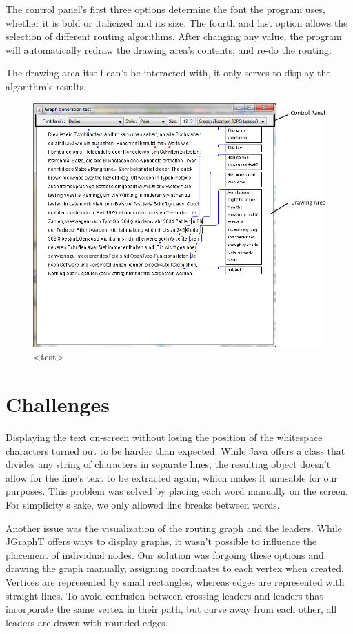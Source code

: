 \documentclass[11pt,a4paper]{vutinfth}
\begin{document}
The control panel's first three options determine the font the program uses, whether it is bold or italicized and its size. The fourth and last option allows the selection of different routing algorithms. After changing any value, the program will automatically redraw the drawing area's contents, and re-do the routing.

The drawing area itself can't be interacted with, it only serves to display the algorithm's results.
\begin{figure}
	\captionsetup{justification=centering, margin=0.75cm}
	\centering
	\includegraphics[scale=0.75]{ProgramWindowAnnotated.png}
	\caption{<test>}
	\label{fig:ProgWindow}
\end{figure}

\section{Challenges}

Displaying the text on-screen without losing the position of the whitespace characters turned out to be harder than expected. While Java offers a class that divides any string of characters in separate lines, the resulting object doesn't allow for the line's text to be extracted again, which makes it unusable for our purposes. This problem was solved by placing each word manually on the screen. For simplicity's sake, we only allowed line breaks between words.

Another issue was the visualization of the routing graph and the leaders. While JGraphT offers ways to display graphs, it wasn't possible to influence the placement of individual nodes. Our solution was forgoing these options and drawing the graph manually, assigning coordinates to each vertex when created. Vertices are represented by small rectangles, whereas edges are represented with straight lines. To avoid confusion between crossing leaders and leaders that incorporate the same vertex in their path, but curve away from each other, all leaders are drawn with rounded edges.
\end{document}
